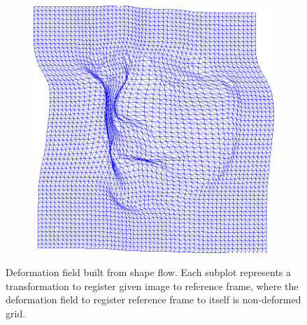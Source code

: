 \begin{figure}[h]
\begin{subfigure}[b]{0.15\textwidth}
    \end{subfigure}
    \hfill
    \begin{subfigure}[b]{0.15\textwidth}
            \includegraphics[width=\textwidth]{resources/Fig_Flows/8}
    \end{subfigure}
    \caption{Deformation field built from shape flow. Each subplot represents a transformation to register given image to reference frame, where the deformation field to register reference frame to itself is non-deformed grid.}
    \label{fig:deformationfield}
\end{figure}


